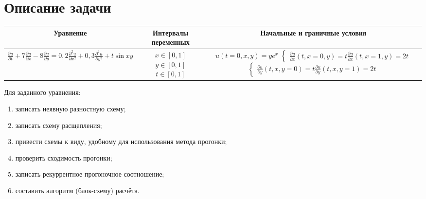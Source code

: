 \documentclass[12pt, a4paper]{report}
\begin{document}
	\section*{Описание задачи}
	\large
	\begin{center}
		\begin{tabular}{||c|c|c||}
			\hline
			Уравнение & \makecell{Интервалы \\ переменных} & Начальные и граничные условия \\

			\hline
			\small 
			$ \frac{\partial u}{\partial t} + 7\frac{\partial u}{\partial x} - 8\frac{\partial u}{\partial y} = 0,2\frac{\partial^{2} u}{\partial x^{2}} + 0,3\frac{\partial^{2} u}{\partial y^{2}} + t\sin{xy} $ & \makecell{$ x \in [0, 1] $ \\ $ y \in [0, 1] $ \\ $ t \in [0, 1] $} & \makecell{$ u(t = 0, x, y) = ye^{x} $ \\ $\begin{cases} \frac{\partial u}{\partial x}(t, x = 0, y) = t \\ \frac{\partial u}{\partial x}(t, x = 1, y) = 2t \end{cases}$ \\ $\begin{cases} \frac{\partial u}{\partial y}(t, x, y = 0) = t \\ \frac{\partial u}{\partial y}(t, x, y = 1) = 2t \end{cases}$} \\

			\hline
		\end{tabular}
	\end{center}

	Для заданного уравнения:
	\begin{enumerate}
		\item записать неявную разностную схему;
		\item записать схему расщепления;
		\item привести схемы к виду, удобному для использования метода прогонки;
		\item проверить сходимость прогонки;
		\item записать рекуррентное прогоночное соотношение;
		\item составить алгоритм (блок-схему) расчёта.
	\end{enumerate}
\end{document}
